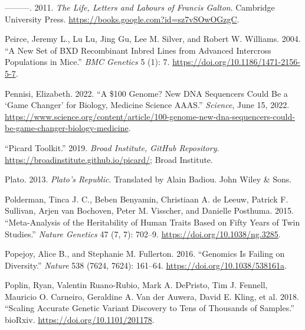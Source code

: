 \documentclass[
]{book}
\newlength{\cslhangindent}
\newlength{\cslentryspacingunit} %
\newenvironment{CSLReferences}[2] %
 {%
  \setlength{\parindent}{0pt}
  \ifodd #1
  \let\oldpar\par
  \def\par{\hangindent=\cslhangindent\oldpar}
  \fi
  \setlength{\parskip}{#2\cslentryspacingunit}
 }%
 {}
\begin{document}
\begin{CSLReferences}{1}{0}
\leavevmode{}%
---------. 2011. \emph{The {Life}, {Letters} and {Labours} of {Francis Galton}}. {Cambridge University Press}. \url{https://books.google.com?id=sz7vSOwOGzgC}.

\leavevmode{}%
Peirce, Jeremy L., Lu Lu, Jing Gu, Lee M. Silver, and Robert W. Williams. 2004. {``A New Set of {BXD} Recombinant Inbred Lines from Advanced Intercross Populations in Mice.''} \emph{BMC Genetics} 5 (1): 7. \url{https://doi.org/10.1186/1471-2156-5-7}.

\leavevmode{}%
Pennisi, Elizabeth. 2022. {``A \$100 Genome? {New DNA} Sequencers Could Be a {`Game Changer'} for Biology, Medicine \textbar{} {Science} \textbar{} {AAAS}.''} \emph{Science}, June 15, 2022. \url{https://www.science.org/content/article/100-genome-new-dna-sequencers-could-be-game-changer-biology-medicine}.

\leavevmode{}%
{``Picard Toolkit.''} 2019. \emph{Broad Institute, GitHub Repository}. \url{https://broadinstitute.github.io/picard/}; Broad Institute.

\leavevmode{}%
Plato. 2013. \emph{Plato's {Republic}}. Translated by Alain Badiou. {John Wiley \& Sons}.

\leavevmode{}%
Polderman, Tinca J. C., Beben Benyamin, Christiaan A. de Leeuw, Patrick F. Sullivan, Arjen van Bochoven, Peter M. Visscher, and Danielle Posthuma. 2015. {``Meta-Analysis of the Heritability of Human Traits Based on Fifty Years of Twin Studies.''} \emph{Nature Genetics} 47 (7, 7): 702--9. \url{https://doi.org/10.1038/ng.3285}.

\leavevmode{}%
Popejoy, Alice B., and Stephanie M. Fullerton. 2016. {``Genomics Is Failing on Diversity.''} \emph{Nature} 538 (7624, 7624): 161--64. \url{https://doi.org/10.1038/538161a}.

\leavevmode{}%
Poplin, Ryan, Valentin Ruano-Rubio, Mark A. DePristo, Tim J. Fennell, Mauricio O. Carneiro, Geraldine A. Van der Auwera, David E. Kling, et al. 2018. {``Scaling Accurate Genetic Variant Discovery to Tens of Thousands of Samples.''} {bioRxiv}. \url{https://doi.org/10.1101/201178}.


\end{CSLReferences}
\end{document}
